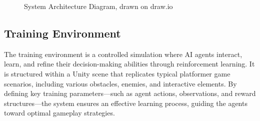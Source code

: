 \documentclass[12pt,oneside,openright,a4paper]{cpe-english-project}
\begin{document}
\begin{figure}[H]
\centering
{}
\caption{System Architecture Diagram, drawn on draw.io}\label{fig:SystemDiagram}
\end{figure}
\FloatBarrier
\subsection{Training Environment}
The training environment is a controlled simulation where AI agents interact, learn, and refine their decision-making abilities through reinforcement learning. It is structured within a Unity scene that replicates typical platformer game scenarios, including various obstacles, enemies, and interactive elements. By defining key training parameters—such as agent actions, observations, and reward structures—the system ensures an effective learning process, guiding the agents toward optimal gameplay strategies.
\end{document}
